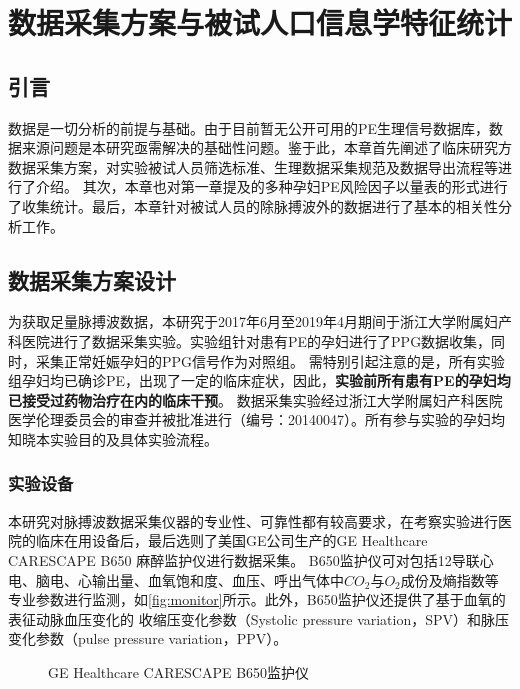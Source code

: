 \chapter{数据采集方案与被试人口信息学特征统计}
\section{引言}
数据是一切分析的前提与基础。由于目前暂无公开可用的PE生理信号数据库，数据来源问题是本研究亟需解决的基础性问题。鉴于此，本章首先阐述了临床研究方数据采集方案，对实验被试人员筛选标准、生理数据采集规范及数据导出流程等进行了介绍。
其次，本章也对第一章提及的多种孕妇PE风险因子以量表的形式进行了收集统计。最后，本章针对被试人员的除脉搏波外的数据进行了基本的相关性分析工作。
\section{数据采集方案设计}
为获取足量脉搏波数据，本研究于2017年6月至2019年4月期间于浙江大学附属妇产科医院进行了数据采集实验。实验组针对患有PE的孕妇进行了PPG数据收集，同时，采集正常妊娠孕妇的PPG信号作为对照组。
需特别引起注意的是，所有实验组孕妇均已确诊PE，出现了一定的临床症状，因此，\textbf{实验前所有患有PE的孕妇均已接受过药物治疗在内的临床干预}。
数据采集实验经过浙江大学附属妇产科医院医学伦理委员会的审查并被批准进行（编号：20140047）。所有参与实验的孕妇均知晓本实验目的及具体实验流程。
\subsection{实验设备}
本研究对脉搏波数据采集仪器的专业性、可靠性都有较高要求，在考察实验进行医院的临床在用设备后，最后选则了美国GE公司生产的GE Healthcare CARESCAPE B650 麻醉监护仪进行数据采集。
B650监护仪可对包括12导联心电、脑电、心输出量、血氧饱和度、血压、呼出气体中$CO_{2}$与$O_{2}$成份及熵指数等专业参数进行监测，如\autoref{fig:monitor}所示。此外，B650监护仪还提供了基于血氧的表征动脉血压变化的
收缩压变化参数（Systolic pressure variation，SPV）和脉压变化参数（pulse pressure variation，PPV）\cite{GE2021,Michard1999}。
\begin{figure}[htbp]
      \centering
      \quad
      \caption{\label{fig:monitor}GE Healthcare CARESCAPE B650监护仪}
\end{figure}

